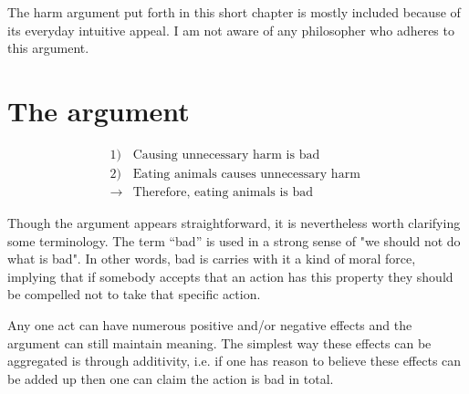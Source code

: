 
The harm argument put forth in this short chapter is mostly included because of its everyday intuitive appeal. I am not aware of any philosopher who adheres to this argument. 

\section{The argument}


\begin{tcolorbox}[enhanced,%
  colback=green!25!black!10!white,colframe=green!75!black,title=Fit box (5cm),
  drop fuzzy shadow,watermark color=white,watermark text=Fit]
\begin{align*}
1)& \text{Causing unnecessary harm is bad} \\
2)& \text{Eating animals causes unnecessary harm } \\
\rightarrow& \text{Therefore, eating animals is bad }
\end{align*}
\end{tcolorbox}





Though the argument appears straightforward, it is nevertheless worth clarifying some terminology. The term “bad” is used in a strong sense of "we should not do what is bad". In other words, bad is carries with it a kind of moral force, implying that if somebody accepts that an action has this property they should be compelled not to take that specific action. 

Any one act can have numerous positive and/or negative effects and the argument can still maintain meaning. The simplest way these effects can be aggregated is through additivity, i.e. if one has reason to believe these effects can be added up then one can claim the action is bad in total. 

